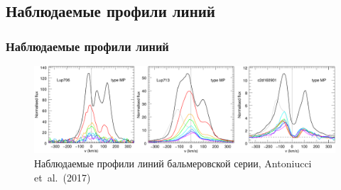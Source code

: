 \documentclass{beamer}
\def\etal{{et~al.}}
\begin{document}


\subsection{Наблюдаемые профили линий}

\begin{frame} 
\frametitle{Наблюдаемые профили линий}

\begin{figure}[h] 
\centering
\includegraphics[width=\textwidth]{profiles.png}
\caption{ Наблюдаемые профили линий бальмеровской серии, Antoniucci \etal\ (2017)}
\label{fig:profiles}
\end{figure}


\end{frame}

\end{document}
